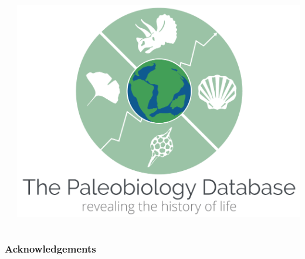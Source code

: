 \documentclass{beamer}
\begin{document}
\begin{frame}
\begin{columns}
\begin{column}{0.35\textwidth}
\begin{itemize}
      \end{itemize}
    \end{column}
    \begin{column}{0.25\textwidth}
      \includegraphics[width=\textwidth,height=\textheight,keepaspectratio=true]{figure/paleodb}
    \end{column}
  \end{columns}
\end{frame}

\begin{frame}
  \frametitle{Acknowledgements}
\end{frame}
\end{document}
